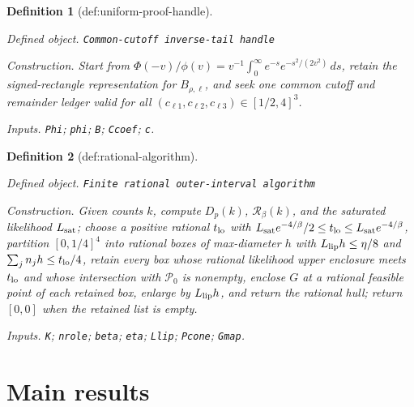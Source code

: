 \documentclass{article}
\newtheorem{definition}{Definition}
\begin{document}
\begin{definition}[def:uniform-proof-handle]\label{def:uniform-proof-handle}
\par\smallskip\noindent\emph{Defined object.} \texttt{Common-\allowbreak{}cutoff inverse-\allowbreak{}tail handle}
\par\smallskip\noindent\emph{Construction.} Start from \(\Phi(-v)/\phi(v)=v^{-1}\int_0^{\infty}e^{-s}e^{-s^2/(2v^2)}\,ds\), retain the signed-rectangle representation for \(B_{\rho,\ell}\), and seek one common cutoff and remainder ledger valid for all \((c_{\ell1},c_{\ell2},c_{\ell3})\in[1/2,4]^3\).
\par\smallskip\noindent\emph{Inputs.} \texttt{Phi}; \texttt{phi}; \texttt{B}; \texttt{Ccoef}; \texttt{c}.
\end{definition}

\begin{definition}[def:rational-algorithm]\label{def:rational-algorithm}
\par\smallskip\noindent\emph{Defined object.} \texttt{Finite rational outer-\allowbreak{}interval algorithm}
\par\smallskip\noindent\emph{Construction.} Given counts \(k\), compute \(D_p(k)\), \(\mathcal R_{\beta}(k)\), and the saturated likelihood \(L_{\rm sat}\); choose a positive rational \(t_{\rm lo}\) with \(L_{\rm sat}e^{-4/\beta}/2\le t_{\rm lo}\le L_{\rm sat}e^{-4/\beta}\), partition \([0,1/4]^4\) into rational boxes of max-diameter \(h\) with \(L_{\rm lip}h\le\eta/8\) and \(\sum_j n_jh\le t_{\rm lo}/4\), retain every box whose rational likelihood upper enclosure meets \(t_{\rm lo}\) and whose intersection with \(\mathcal P_0\) is nonempty, enclose \(G\) at a rational feasible point of each retained box, enlarge by \(L_{\rm lip}h\), and return the rational hull; return \([0,0]\) when the retained list is empty.
\par\smallskip\noindent\emph{Inputs.} \texttt{K}; \texttt{nrole}; \texttt{beta}; \texttt{eta}; \texttt{Llip}; \texttt{Pcone}; \texttt{Gmap}.
\end{definition}

\section{Main results}
\end{document}
